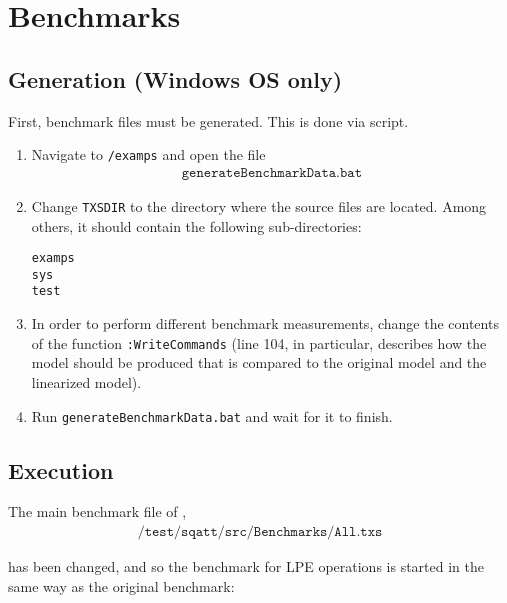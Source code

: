 \section{Benchmarks}

\subsection{Generation (Windows OS only)}
First, benchmark files must be generated.
This is done via script.

\begin{enumerate}
\item Navigate to \texttt{/examps} and open the file
\begin{align*}
\texttt{generateBenchmarkData.bat}
\end{align*}

\item Change \texttt{TXSDIR} to the directory where the \txs{} source files are located.
Among others, it should contain the following sub-directories:
\begin{center}
\texttt{examps} \\
\texttt{sys} \\
\texttt{test}
\end{center}

\item In order to perform different benchmark measurements, change the contents of the function \texttt{:WriteCommands} (line 104, in particular, describes how the model should be produced that is compared to the original model and the linearized model).

\item Run \texttt{generateBenchmarkData.bat} and wait for it to finish.
\end{enumerate}

\subsection{Execution}
The main benchmark file of \txs{},
\begin{align*}
\texttt{/test/sqatt/src/Benchmarks/All.txs}
\end{align*}

has been changed, and so the benchmark for LPE operations is started in the same way as the original benchmark:

